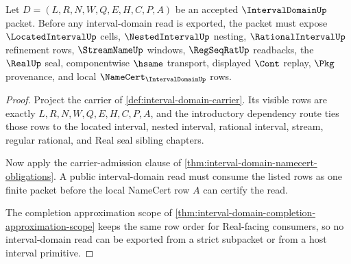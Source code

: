\begin{theorem}
\label{thm:interval-domain-carrier-admission}
Let $D=(L,R,N,W,Q,E,H,C,P,A)$ be an accepted $\IntervalDomainUp$ packet. Before any interval-domain read is exported, the packet must expose $\LocatedIntervalUp$ cells, $\NestedIntervalUp$ nesting, $\RationalIntervalUp$ refinement rows, $\StreamNameUp$ windows, $\RegSeqRatUp$ readbacks, the $\RealUp$ seal, componentwise $\hsame$ transport, displayed $\Cont$ replay, $\Pkg$ provenance, and local $\NameCert_{\IntervalDomainUp}$ rows.
\end{theorem}
\begin{proof}
Project the carrier of \autoref{def:interval-domain-carrier}. Its visible rows are exactly $L,R,N,W,Q,E,H,C,P,A$, and the introductory dependency route ties those rows to the located interval, nested interval, rational interval, stream, regular rational, and Real seal sibling chapters.

Now apply the carrier-admission clause of \autoref{thm:interval-domain-namecert-obligations}. A public interval-domain read must consume the listed rows as one finite packet before the local NameCert row $A$ can certify the read.

The completion approximation scope of \autoref{thm:interval-domain-completion-approximation-scope} keeps the same row order for Real-facing consumers, so no interval-domain read can be exported from a strict subpacket or from a host interval primitive.
\end{proof}

